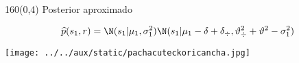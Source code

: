\documentclass[shownotes,aspectratio=169]{beamer}
\begin{document}
\begin{frame}[plain]
\begin{textblock}{160}(0,4)
 \centering \Large Posterior aproximado
\end{textblock}
\begin{equation*}
 \widehat{p}(s_1, r) = \N(s_1|\mu_1, \sigma_1^2) \N(s_1| \mu_1 - \delta + \delta_{\div}, \vartheta_{\div}^2 + \vartheta^2 - \sigma_1^2)
\end{equation*}
\end{frame}


\begin{frame}[plain]
\centering
  \texttt{[image: ../../aux/static/pachacuteckoricancha.jpg]}
\end{frame}
\end{document}
